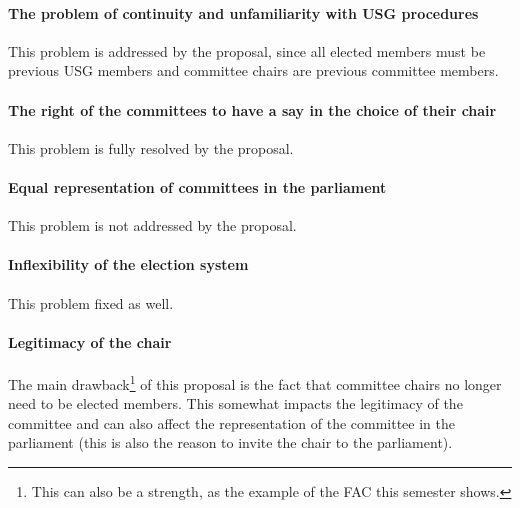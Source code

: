 \paragraph{The problem of continuity and unfamiliarity with USG procedures} This problem is addressed by the proposal, since all elected members must be previous USG members and committee chairs are previous committee members. 

\paragraph{The right of the committees to have a say in the choice of their chair}
This problem is fully resolved by the proposal. 

\paragraph{Equal representation of committees in the parliament}
This problem is not addressed by the proposal.

\paragraph{Inflexibility of the election system}
This problem fixed as well. 

\paragraph{Legitimacy of the chair} The main drawback\protect\footnote{This can also be a strength, as the example of the FAC this semester shows.} of this proposal is the fact that committee chairs no longer need to be elected members. This somewhat impacts the legitimacy of the committee and can also affect the representation of the committee in the parliament (this is also the reason to invite the chair to the parliament). 